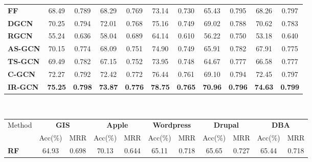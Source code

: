 \documentclass[smallcondensed]{svjour3}     %
\begin{document}
\begin{table}[h]
\begin{subtable}{\textwidth}
\begin{tabular}{l|c c|c c|c c|c c|c c}
     \textbf{FF~\cite{JendersKN16}} & 68.49 & 0.789 & 68.29 & 0.769 & 73.14 & 0.730 & 65.43 & 0.795 & 68.26 & 0.797\\
     \textbf{DGCN~\cite{DualGCN}} & 70.25 & 0.794 & 72.01 & 0.768 & 75.16 & 0.749 & 69.02 & 0.788 & 70.62 & 0.783 \\
     \textbf{RGCN~\cite{relationalGCN}} & 55.24 & 0.636 & 58.04 & 0.689 & 64.14 & 0.610 & 56.22 & 0.750 & 53.18 & 0.640\\
     \cmidrule(lr){1-1}\cmidrule(lr){2-11}%
     \textbf{AS-GCN} & 70.15 &0.774 & 68.09 & 0.751 &74.90 & 0.749 & 65.91 & 0.782 & 67.91 & 0.775 \\
     \textbf{TS-GCN} & 69.49 & 0.782 & 67.15 & 0.752 & 73.95 & 0.748 & 64.67 & 0.777 & 66.58 &0.777\\
     \textbf{C-GCN } & 72.27 & 0.792 & 72.42 & 0.772 & 76.44 & 0.761& 69.10 & 0.794 & 72.45 & 0.797\\
     \textbf{IR-GCN} & \textbf{75.25} & \textbf{0.798} & \bfseries 73.87 & \bfseries 0.776 & \bfseries 78.75 & \bfseries 0.765 & \textbf{70.96} & \textbf{0.796} & \textbf{74.63} & \textbf{0.799} \\
     \bottomrule
   \end{tabular}\\
   \begin{tabular}{l|c c|c c|c c|c c|c c}
      \toprule
      \multirow{2}{*}{Method} &
         \multicolumn{2}{c}{\textbf{GIS}} &
        \multicolumn{2}{c}{\textbf{Apple}} &
        \multicolumn{2}{c}{\textbf{Wordpress}} &
        \multicolumn{2}{c}{\textbf{Drupal}} &
        \multicolumn{2}{c}{\textbf{DBA}}\\
        &{Acc(\%)} & {MRR}&{Acc(\%)} & {MRR}&{Acc(\%)}& {MRR}&{Acc(\%)} & {MRR}&{Acc(\%)} & {MRR}\\
        \midrule
      \textbf{RF~\cite{BurelMA16,TianZL13}} & 64.93 & 0.698 & 70.13 & 0.644 & 65.11 & 0.718 & 65.65 & 0.727 & 65.44 & 0.718\\



\end{tabular}
\end{subtable}
\end{table}
\end{document}

